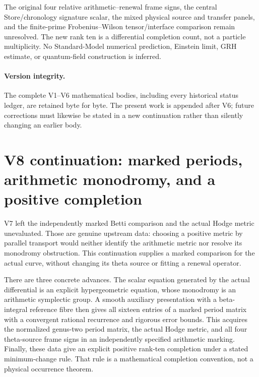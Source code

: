 \documentclass[11pt]{article}
\theoremstyle{definition}
\theoremstyle{remark}
\begin{document}
The original four relative arithmetic--renewal frame signs, the central
Store/chronology signature scalar, the mixed physical source and transfer
panels, and the finite-prime Frobenius--Wilson tensor/interface comparison
remain unresolved. The new rank ten is a differential completion count, not a
particle multiplicity. No Standard-Model numerical prediction, Einstein limit,
GRH estimate, or quantum-field construction is inferred.

\paragraph{Version integrity.}
The complete V1--V6 mathematical bodies, including every historical status
ledger, are retained byte for byte. The present work is appended after V6;
future corrections must likewise be stated in a new continuation rather than
silently changing an earlier body.
\clearpage
\section{V8 continuation: marked periods, arithmetic monodromy, and a positive completion}
\label{sec:v8-context}

V7 left the independently marked Betti comparison and the actual Hodge metric
unevaluated. Those are genuine upstream data: choosing a positive metric by
parallel transport would neither identify the arithmetic metric nor resolve
its monodromy obstruction. This continuation supplies a marked comparison
for the actual curve, without changing its theta source or fitting a renewal
operator.

There are three concrete advances. The scalar equation generated by the
actual differential is an explicit hypergeometric equation, whose monodromy
is an arithmetic symplectic group. A smooth auxiliary presentation with a
beta-integral reference fibre then gives all sixteen entries of a marked
period matrix with a convergent rational recurrence and rigorous error
bounds. This acquires the normalized genus-two period matrix, the actual
Hodge metric, and all four theta-source frame signs in an independently
specified arithmetic marking. Finally, these data give an explicit positive
rank-ten completion under a stated minimum-change rule. That rule is a
mathematical completion convention, not a physical occurrence theorem.
\end{document}
